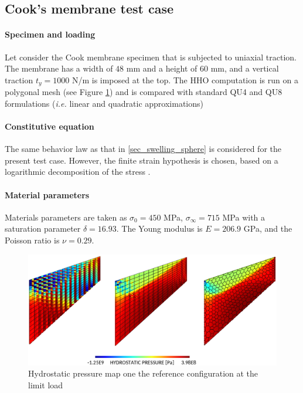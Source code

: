 \subsection{Cook's membrane test case}

\paragraph{Specimen and loading}

Let consider the Cook membrane specimen that is subjected to uniaxial
traction. The membrane has a width of $48$ mm and a height of $60$ mm,
and a vertical traction $t_y = 1000$ N/m is imposed at the top. The HHO
computation is run on a polygonal mesh (see Figure \ref{fig_cook}) and
is compared with standard QU4 and QU8 formulations (\textit{i.e.} linear
and quadratic approximations)

\paragraph{Constitutive equation}

The same behavior law as that in \ref{sec_swelling_sphere} is
considered for the present test case. However, the finite strain
hypothesis is chosen, based on a logarithmic decomposition of the stress
\cite{miehe_anisotropic_2002}.

\paragraph{Material parameters}

Materials parameters are taken as
$\sigma_0 = 450$ MPa, $\sigma_{\infty} = 715$ MPa with a saturation parameter $\delta = 16.93$. The Young modulus is $E = 206.9$ GPa, and the Poisson ratio is $\nu = 0.29$.

\begin{figure}[H]
    \centering
    \includegraphics[width=12.cm]{img_calcs/cook_comp.png}
    \caption{Hydrostatic pressure map one the reference configuration at the limit load}
    \label{fig_cook}
\end{figure}

